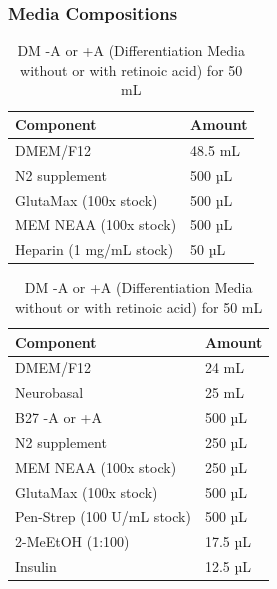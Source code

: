 \documentclass[11pt]{article}
\begin{document}
\subsubsection{Media Compositions}

\begin{table}[H]
    \begin{minipage}{0.45\textwidth}
        \centering
        \caption{NIM (Neuroinduction Media) for 50 mL}
        \label{tab:nim}
        \begin{tabular}{ll}
        \hline
        \textbf{Component} & \textbf{Amount} \\
        \hline
        DMEM/F12 & 48.5 mL \\
        N2 supplement & 500 µL \\
        GlutaMax (100x stock) & 500 µL \\
        MEM NEAA (100x stock) & 500 µL \\
        Heparin (1 mg/mL stock) & 50 µL \\
        \hline
        \end{tabular}
    \end{minipage}
    \hfill
    \begin{minipage}{0.45\textwidth}
        \centering
        \caption{DM -A or +A (Differentiation Media without or with retinoic acid) for 50 mL}
        \label{tab:dm}
        \begin{tabular}{ll}
        \hline
        \textbf{Component} & \textbf{Amount} \\
        \hline
        DMEM/F12 & 24 mL \\
        Neurobasal & 25 mL \\
        B27 -A or +A & 500 µL \\
        N2 supplement & 250 µL \\
        MEM NEAA (100x stock) & 250 µL \\
        GlutaMax (100x stock) & 500 µL \\
        Pen-Strep (100 U/mL stock) & 500 µL \\
        2-MeEtOH (1:100) & 17.5 µL \\
        Insulin & 12.5 µL \\
        \hline
        \end{tabular}
    \end{minipage}
    \end{table}
\end{document}
